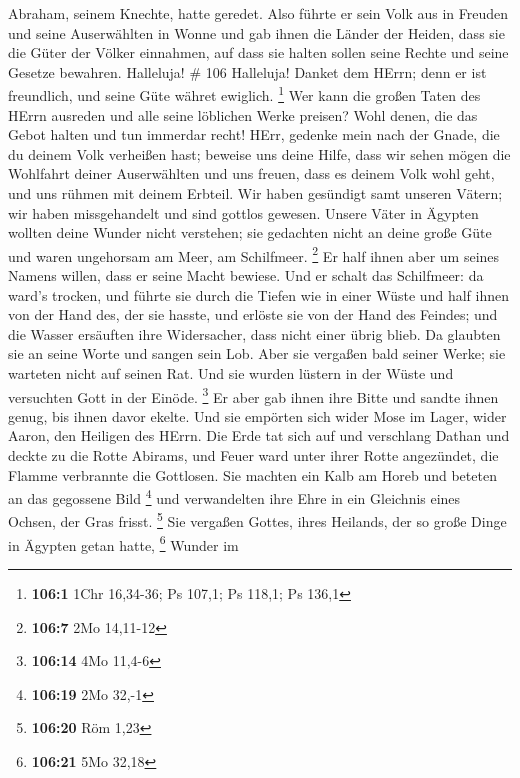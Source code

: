 Abraham, seinem Knechte, hatte geredet.  Also führte er
sein Volk aus in Freuden und seine Auserwählten in Wonne 
und gab ihnen die Länder der Heiden, dass sie die Güter der Völker
einnahmen,  auf dass sie halten sollen seine Rechte und
seine Gesetze bewahren. Halleluja! \# 106  Halleluja! Danket
dem HErrn; denn er ist freundlich, und seine Güte währet ewiglich.
\footnote{\textbf{106:1} 1Chr 16,34-36; Ps 107,1; Ps 118,1; Ps 136,1}
 Wer kann die großen Taten des HErrn ausreden und alle seine
löblichen Werke preisen?  Wohl denen, die das Gebot halten
und tun immerdar recht!  HErr, gedenke mein nach der Gnade,
die du deinem Volk verheißen hast; beweise uns deine Hilfe, 
dass wir sehen mögen die Wohlfahrt deiner Auserwählten und uns freuen,
dass es deinem Volk wohl geht, und uns rühmen mit deinem Erbteil.
 Wir haben gesündigt samt unseren Vätern; wir haben
missgehandelt und sind gottlos gewesen.  Unsere Väter in
Ägypten wollten deine Wunder nicht verstehen; sie gedachten nicht an
deine große Güte und waren ungehorsam am Meer, am Schilfmeer.
\footnote{\textbf{106:7} 2Mo 14,11-12}  Er half ihnen aber
um seines Namens willen, dass er seine Macht bewiese.  Und
er schalt das Schilfmeer: da ward's trocken, und führte sie durch die
Tiefen wie in einer Wüste  und half ihnen von der Hand des,
der sie hasste, und erlöste sie von der Hand des Feindes; 
und die Wasser ersäuften ihre Widersacher, dass nicht einer übrig blieb.
 Da glaubten sie an seine Worte und sangen sein Lob.
 Aber sie vergaßen bald seiner Werke; sie warteten nicht
auf seinen Rat.  Und sie wurden lüstern in der Wüste und
versuchten Gott in der Einöde. \footnote{\textbf{106:14} 4Mo 11,4-6}
 Er aber gab ihnen ihre Bitte und sandte ihnen genug, bis
ihnen davor ekelte.  Und sie empörten sich wider Mose im
Lager, wider Aaron, den Heiligen des HErrn.  Die Erde tat
sich auf und verschlang Dathan und deckte zu die Rotte Abirams,
 und Feuer ward unter ihrer Rotte angezündet, die Flamme
verbrannte die Gottlosen.  Sie machten ein Kalb am Horeb
und beteten an das gegossene Bild \footnote{\textbf{106:19} 2Mo 32,-1}
 und verwandelten ihre Ehre in ein Gleichnis eines Ochsen,
der Gras frisst. \footnote{\textbf{106:20} Röm 1,23}  Sie
vergaßen Gottes, ihres Heilands, der so große Dinge in Ägypten getan
hatte, \footnote{\textbf{106:21} 5Mo 32,18}  Wunder im
